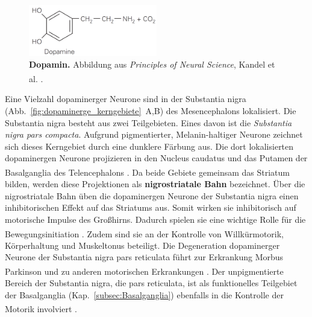 \documentclass[12pt,a4paper,pdftex]{article}
\begin{document}
\begin{figure}[H]
    \centering
    \includegraphics[width=0.5\textwidth]{pictures/Bilder_monoamine_systeme/dopamin.PNG}
    \caption[Dopamin]{\textbf{Dopamin.} Abbildung aus \textit{Principles of Neural Science}, Kandel et al. \textsuperscript{\cite[13]{kandel2013principles}}.}
    \label{fig:dopamin}
\end{figure}{}

Eine Vielzahl dopaminerger Neurone sind in der Substantia nigra (Abb.~\ref{fig:dopaminerge_kerngebiete}~A,B) des Mesencephalons lokalisiert.
Die Substantia nigra besteht aus zwei Teilgebieten. Eines davon ist die \textit{Substantia nigra pars compacta}. 
Aufgrund pigmentierter, Melanin-haltiger Neurone zeichnet sich dieses Kerngebiet durch eine dunklere Färbung aus.
Die dort lokalisierten dopaminergen Neurone projizieren in den Nucleus caudatus und das Putamen der Basalganglia des Telencephalons \textsuperscript{\cite[9]{crossman2014neuroanatomy}}.
Da beide Gebiete gemeinsam das Striatum bilden, werden diese Projektionen als \textbf{nigrostriatale Bahn}  bezeichnet.
Über die nigrostriatale Bahn üben die dopaminergen Neurone der Substantia nigra einen inhibitorischen Effekt auf das Striatums aus. Somit wirken sie inhibitorisch auf motorische Impulse des Großhirns.
Dadurch spielen sie eine wichtige Rolle für die Bewegungsinitiation \textsuperscript{\cite[6]{trepel2011neuroanatomie}}.
Zudem sind sie an der Kontrolle von Willkürmotorik, Körperhaltung und Muskeltonus beteiligt. Die Degeneration dopaminerger Neurone der Substantia nigra pars reticulata führt zur Erkrankung Morbus Parkinson \textsuperscript{\cite[9]{crossman2014neuroanatomy}} und zu anderen motorischen Erkrankungen \textsuperscript{\cite[13]{kandel2013principles}}.
Der unpigmentierte Bereich der Substantia nigra, die pars reticulata, ist als funktionelles Teilgebiet der Basalganglia (Kap.~\ref{subsec:Basalganglia}) ebenfalls in die Kontrolle der Motorik involviert \textsuperscript{\cite[9]{crossman2014neuroanatomy}}.
\end{document}
